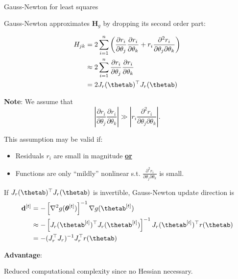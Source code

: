 \documentclass[11pt,compress,t,notes=noshow, xcolor=table]{beamer}
\begin{document}
\begin{vbframe}{Gauss-Newton for least squares}

Gauss-Newton approximates $\mathbf{H}_g$ by dropping its second order part:

\begin{align*}
    H_{jk} &= 2 \sum_{i=1}^n \left(\frac{\partial r_i}{\partial \theta_j}\frac{\partial r_i}{\partial \theta_k} + r_i \frac{\partial^2 r_i}{\partial \theta_j \partial \theta_k}\right) \\
    &\approx  2 \sum_{i=1}^n \frac{\partial r_i}{\partial \theta_j}\frac{\partial r_i}{\partial \theta_k} \\
    &= 2 J_r(\thetab)^\top J_r(\thetab)
\end{align*}

\textbf{Note}: We assume that
\begin{equation*}
    \left|\frac{\partial r_i}{\partial \theta_j}\frac{\partial r_i}{\partial \theta_k}\right| \gg \left|r_i \frac{\partial^2 r_i}{\partial \theta_j \partial \theta_k}\right|.
\end{equation*}

This assumption may be valid if: 

\begin{itemize}
	\item Residuals $r_i$ are small in magnitude \underline{\textbf{or}}
	\item Functions are only \enquote{mildly} nonlinear s.t. $\frac{\partial^2 r_i}{\partial \theta_j \partial \theta_k}$ is small. 
\end{itemize}

\framebreak 

If $J_r(\thetab)^\top J_r(\thetab)$ is invertible, Gauss-Newton update direction is
\begin{align*}
    \mathbf{d}^{[t]} &= - \left[\nabla^2 g(\bm{\theta}^{[t]})\right]^{-1} \nabla g(\thetab^{[t]}) \\
    &\approx - \left[J_r(\thetab^{[t]})^\top J_r(\thetab^{[t]})\right]^{-1} J_r(\thetab^{[t]})^\top r(\thetab) \\
    &= - (J_r^\top J_r)^{-1} J_r^\top r(\thetab)
\end{align*}

\textbf{Advantage}:
\vspace{-0.5\baselineskip}
\begin{framed}
    Reduced computational complexity since no Hessian necessary.
\end{framed}


\end{vbframe}
\end{document}
